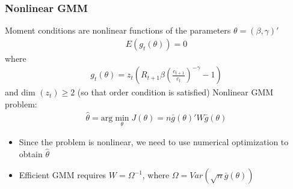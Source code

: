 \documentclass[a4paper,twoside,11pt]{article}
\begin{document}
\subsubsection{Nonlinear GMM}
Moment conditions are nonlinear functions of the parameters $\theta = (\beta, \gamma)'$
\begin{equation*}
\begin{aligned}
E(g_t(\theta)) = 0
\end{aligned} 
\end{equation*}
where
\begin{equation*}
\begin{aligned}
g_t (\theta) = z_t ( R_{t+1} \beta (\frac{c_{t+1}}{c_t})^{-\gamma} -1 )
\end{aligned} 
\end{equation*}
and dim $(z_t) \ge 2$ (so that order condition is satisfied) 
\newline
\newline
Nonlinear GMM problem:
\begin{equation*}
\begin{aligned}
\hat{\theta} = \text{arg}\underset{\theta}{\min} J(\theta) =n \bar g(\theta)' W \bar g(\theta) 
\end{aligned} 
\end{equation*}
\begin{itemize}
    \item Since the problem is nonlinear, we need to use numerical optimization to obtain $\hat{\theta}$
    \item Efficient GMM requires $W = \Omega^{-1}$, where $\Omega = Var(\sqrt{n} \bar g(\theta))$
\end{itemize}
\end{document}
